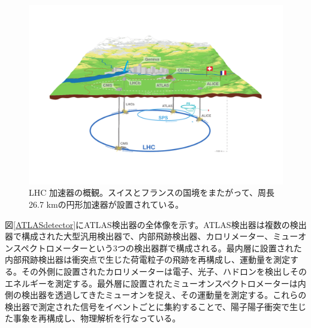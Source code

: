 \begin{figure} 
\centering
\includegraphics[width=16cm]{fig/Intro/LHCoverview.pdf}
\caption[LHC 加速器の概観]{LHC 加速器の概観\cite{cern_general_photo}。スイスとフランスの国境をまたがって、周長26.7 kmの円形加速器が設置されている。}
\label{LHCoverview}
\end{figure}

図\ref{ATLASdetector}にATLAS検出器の全体像を示す。ATLAS検出器は複数の検出器で構成された大型汎用検出器で、内部飛跡検出器、カロリメーター、ミューオンスペクトロメーターという3つの検出器群で構成される。最内層に設置された内部飛跡検出器は衝突点で生じた荷電粒子の飛跡を再構成し、運動量を測定する。その外側に設置されたカロリメーターは電子、光子、ハドロンを検出しそのエネルギーを測定する。最外層に設置されたミューオンスペクトロメーターは内側の検出器を透過してきたミューオンを捉え、その運動量を測定する。これらの検出器で測定された信号をイベントごとに集約することで、陽子陽子衝突で生じた事象を再構成し、物理解析を行なっている。

